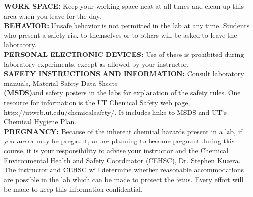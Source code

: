 \documentclass[12pt]{article}
\begin{document}
\newline %
\textbf{ WORK SPACE:} Keep your working space neat at all times and clean up this area when you leave for the day.\\
\newline %
\textbf{ BEHAVIOR:} Unsafe behavior is not permitted in the lab at any time. Students who present a safety risk to themselves or to others will be asked to leave the laboratory.\\
\newline %
\textbf{PERSONAL ELECTRONIC DEVICES:} Use of these is prohibited during laboratory experiments, except as allowed by your instructor.\\
\newline %
\textbf{SAFETY INSTRUCTIONS AND INFORMATION:} Consult laboratory manuals, Material Safety Data Sheets\\
\newline %
\textbf{(MSDS)}and safety posters in the labs for explanation of the safety rules. One resource for information is the UT Chemical Safety web page, http://utweb.ut.edu/chemicalsafety/. It includes links to MSDS and UT’s Chemical
Hygiene Plan.\\
\newline %
\textbf{PREGNANCY:} Because of the inherent chemical hazards present in a lab, if you are or may be pregnant, or are planning to become pregnant during this course, it is your responsibility to advise your instructor and the Chemical Environmental Health and Safety Coordinator (CEHSC), Dr. Stephen Kucera. The instructor and CEHSC will determine whether reasonable accommodations are possible in the lab which can be made to protect the fetus. Every effort will be made to keep this information confidential.\\
\noindent\makebox[\linewidth]{\rule{\paperwidth}{0.4pt}}
\end{document}
